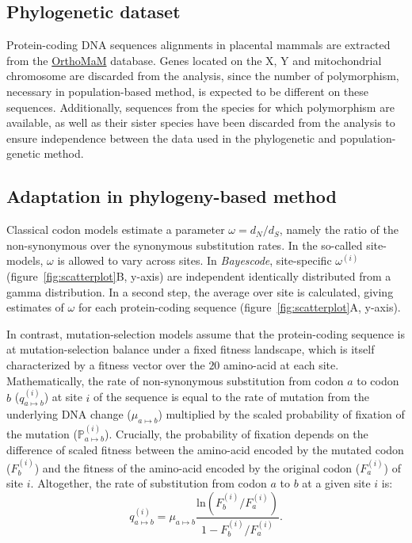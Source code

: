 \documentclass{article}
\newcommand{\dn}{d_N}
\newcommand{\ds}{d_S}
\newcommand{\dnds}{\dn / \ds}
\newcommand{\proba}{\mathbb{P}}
\begin{document}
\subsection*{Phylogenetic dataset}
Protein-coding DNA sequences alignments in placental mammals are extracted from the \href{https://www.orthomam.univ-montp2.fr}{OrthoMaM} database\cite{ranwez_orthomam_2007, douzery_orthomam_2014, scornavacca_orthomam_2019}.
Genes located on the X, Y and mitochondrial chromosome are discarded from the analysis, since the number of polymorphism, necessary in population-based method, is expected to be different on these sequences.
Additionally, sequences from the species for which polymorphism are available, as well as their sister species have been discarded from the analysis to ensure independence between the data used in the phylogenetic and population-genetic method.

\subsection*{Adaptation in phylogeny-based method}
Classical codon models estimate a parameter $\omega=\dnds$, namely the ratio of the non-synonymous over the synonymous substitution rates\cite{muse_likelihood_1994,goldman_codon-based_1994}.
In the so-called site-models, $\omega$ is allowed to vary across sites\cite{yang_codon-substitution_2000, huelsenbeck_dirichlet_2006}.
In \textit{Bayescode}, site-specific $\omega^{(i)}$ (figure~\ref{fig:scatterplot}B, y-axis) are independent identically distributed from a gamma distribution\cite{lartillot_phylobayes_2013}.
In a second step, the average over site is calculated, giving estimates of $\omega$ for each protein-coding sequence (figure~\ref{fig:scatterplot}A, y-axis).

In contrast, mutation-selection models assume that the protein-coding sequence is at mutation-selection balance under a fixed fitness landscape, which is itself characterized by a fitness vector over the $20$ amino-acid at each site\cite{yang_mutation-selection_2008, halpern_evolutionary_1998, rodrigue_mechanistic_2010}.
Mathematically, the rate of non-synonymous substitution from codon $a$ to codon $b$ ($q_{a \mapsto b}^{(i)}$) at site $i$ of the sequence is equal to the rate of mutation from the underlying DNA change ($\mu_{a \mapsto b}$) multiplied by the scaled probability of fixation of the mutation ($\proba_{a \mapsto b}^{(i)}$).
Crucially, the probability of fixation depends on the difference of scaled fitness between the amino-acid encoded by the mutated codon ($F_b^{(i)}$) and the fitness of the amino-acid encoded by the original codon ($F_a^{(i)}$) of site $i$\cite{wright_evolution_1931, fisher_genetical_1930}.
Altogether, the rate of substitution from codon $a$ to $b$ at a given site $i$ is:
\begin{equation}
	q_{a \mapsto b}^{(i)} = \mu_{a \mapsto b} \dfrac{\mathrm{ln}(F_b^{(i)} / F_a^{(i)})}{1 - F_b^{(i)} / F_a^{(i)}}.
\end{equation}
\end{document}
